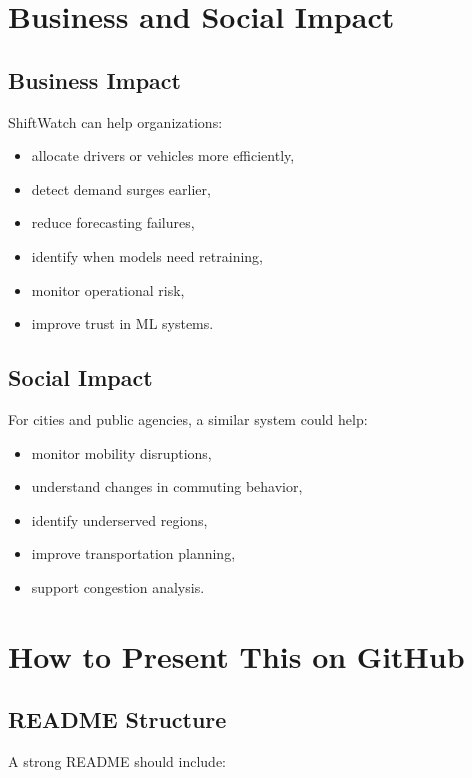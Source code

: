 \documentclass[11pt]{article}
\begin{document}
\section{Business and Social Impact}

\subsection{Business Impact}

ShiftWatch can help organizations:

\begin{itemize}
    \item allocate drivers or vehicles more efficiently,
    \item detect demand surges earlier,
    \item reduce forecasting failures,
    \item identify when models need retraining,
    \item monitor operational risk,
    \item improve trust in ML systems.
\end{itemize}

\subsection{Social Impact}

For cities and public agencies, a similar system could help:

\begin{itemize}
    \item monitor mobility disruptions,
    \item understand changes in commuting behavior,
    \item identify underserved regions,
    \item improve transportation planning,
    \item support congestion analysis.
\end{itemize}

\section{How to Present This on GitHub}

\subsection{README Structure}

A strong README should include:
\end{document}
